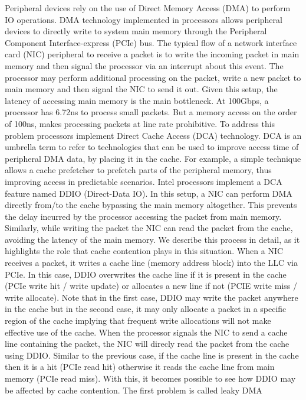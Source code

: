 \documentclass[sigconf,authorversion,noacm]{acmart}
\begin{document}
Peripheral devices rely on the use of Direct Memory Access (DMA) to perform IO
operations. DMA technology implemented in processors allows peripheral devices
to directly write to system main memory through the Peripheral Component
Interface-express (PCIe) bus. The typical flow of a network interface card (NIC)
peripheral to receive a packet is to write the incoming packet in main memory
and then signal the processor via an interrupt about this event. The processor
may perform additional processing on the packet, write a new packet to main
memory and then signal the NIC to send it out. Given this setup, the latency of
accessing main memory is the main bottleneck. At 100Gbps, a processor has 6.72ns
to process small packets. But a memory access on the order of 100ns, makes
processing packets at line rate prohibitive. To address this problem processors
implement Direct Cache Access (DCA) technology. DCA is an umbrella term to refer
to technologies that can be used to improve access time of peripheral DMA data,
by placing it in the cache. For example, a simple technique allows a cache
prefetcher to prefetch parts of the peripheral memory, thus improving access in
predictable scenarios. Intel processors implement a DCA feature named DDIO
(Direct-Data IO). In this setup, a NIC can perform DMA directly from/to the
cache bypassing the main memory altogether. This prevents the delay incurred by
the processor accessing the packet from main memory. Similarly, while writing
the packet the NIC can read the packet from the cache, avoiding the latency of
the main memory. We describe this process in detail, as it highlights the role
that cache contention plays in this situation. When a NIC receives a packet, it
writes a cache line (memory address block) into the LLC via PCIe. In this case,
DDIO overwrites the cache line if it is present in the cache (PCIe write hit /
write update) or allocates a new line if not (PCIE write miss / write allocate).
Note that in the first case, DDIO may write the packet anywhere in the cache but
in the second case, it may only allocate a packet in a specific region of the
cache implying that frequent write allocations will not make effective use of
the cache. When the processor signals the NIC to send a cache line containing
the packet, the NIC will direcly read the packet from the cache using DDIO.
Similar to the previous case, if the cache line is present in the cache then it
is a hit (PCIe read hit) otherwise it reads the cache line from main memory
(PCIe read miss). With this, it becomes possible to see how DDIO may be affected
by cache contention. The first problem is called leaky DMA
\end{document}
